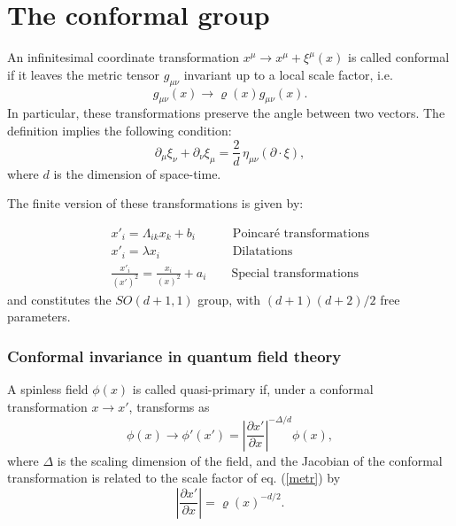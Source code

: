 \documentclass[a4paper,12pt]{report}
\begin{document}
\vspace{1cm}

\section{The conformal group}

An infinitesimal coordinate transformation $x^{\mu}\rightarrow x^{\mu}+\xi^{\mu}(x)$ is called conformal if it
leaves the metric tensor $g_{\mu\nu}$ invariant up to a local scale factor, i.e.
\begin{equation}\label{metr}
g_{\mu\nu}(x)\rightarrow \varrho(x)g_{\mu\nu}(x).
\end{equation}
In particular, these transformations preserve the angle between two vectors. The definition implies the following
condition:
\begin{equation}\label{csi}
\partial_{\mu}\xi_{\nu}+\partial_{\nu}\xi_{\mu}=\frac{2}{d}\,\eta_{\mu\nu}(\partial\cdot\xi),
\end{equation}
where $d$ is the dimension of space-time.

The finite version of these transformations is given by:

\begin{eqnarray}
&& x'_{i}=\Lambda_{ik}x_{k}+b_{i} \qquad\quad\textrm{Poincar\'e transformations} \\
&& x'_{i}=\lambda x_{i}\qquad\qquad\quad\;\;\;\textrm{Dilatations} \\
&& \frac{x'_{i}}{(x')^{2}}=\frac{x_{i}}{(x)^{2}}+a_{i}\qquad\textrm{Special transformations}
\end{eqnarray}
and constitutes the $SO(d+1,1)$ group, with $(d+1)(d+2)/2$ free parameters.

\subsubsection{Conformal invariance in quantum field theory}

A spinless field $\phi(x)$ is called quasi-primary if, under a conformal transformation $x\rightarrow x'$,
transforms as
\begin{equation}
\phi(x)\rightarrow\phi'(x')=\left|\frac{\partial x'}{\partial x}\right|^{-\Delta/d}\phi(x),
\end{equation}
where $\Delta$ is the scaling dimension of the field, and the Jacobian of the conformal transformation is related
to the scale factor of eq. (\ref{metr}) by
\begin{equation}\label{jac}
\left|\frac{\partial x'}{\partial x}\right|=\varrho(x)^{-d/2}.
\end{equation}
\end{document}
